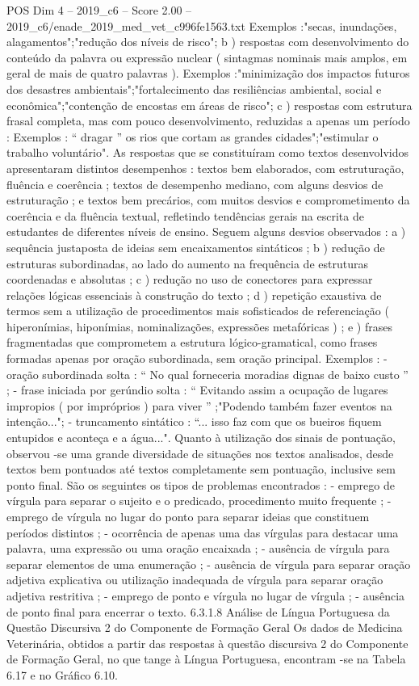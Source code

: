 \begin{textsample}{POS Dim 4 – 2019\_c6 – Score 2.00 – 2019\_c6/enade\_2019\_med\_vet\_c996fe1563.txt}
Exemplos :"secas, inundações, alagamentos";"redução dos níveis de risco"; b ) respostas com desenvolvimento do conteúdo da palavra ou expressão nuclear ( sintagmas nominais mais amplos, em geral de mais de quatro palavras ).
Exemplos :"minimização dos impactos futuros dos desastres ambientais";"fortalecimento das resiliências ambiental, social e econômica";"contenção de encostas em áreas de risco"; c ) respostas com estrutura frasal completa, mas com pouco desenvolvimento, reduzidas a apenas um período : Exemplos : “ dragar ” os rios que cortam as grandes cidades";"estimular o trabalho voluntário".
As respostas que se constituíram como textos desenvolvidos apresentaram distintos desempenhos : textos bem elaborados, com estruturação, fluência e coerência ; textos de desempenho mediano, com alguns desvios de estruturação ; e textos bem precários, com muitos desvios e comprometimento da coerência e da fluência textual, refletindo tendências gerais na escrita de estudantes de diferentes níveis de ensino.
Seguem alguns desvios observados : a ) sequência justaposta de ideias sem encaixamentos sintáticos ; b ) redução de estruturas subordinadas, ao lado do aumento na frequência de estruturas coordenadas e absolutas ; c ) redução no uso de conectores para expressar relações lógicas essenciais à construção do texto ; d ) repetição exaustiva de termos sem a utilização de procedimentos mais sofisticados de referenciação ( hiperonímias, hiponímias, nominalizações, expressões metafóricas ) ; e ) frases fragmentadas que comprometem a estrutura lógico-gramatical, como frases formadas apenas por oração subordinada, sem oração principal.
Exemplos : - oração subordinada solta : “ No qual forneceria moradias dignas de baixo custo ” ; - frase iniciada por gerúndio solta : “ Evitando assim a ocupação de lugares impropios ( por impróprios ) para viver ” ;"Podendo também fazer eventos na intenção..."; - truncamento sintático : “... isso faz com que os bueiros fiquem entupidos e aconteça e a água...".
Quanto à utilização dos sinais de pontuação, observou -se uma grande diversidade de situações nos textos analisados, desde textos bem pontuados até textos completamente sem pontuação, inclusive sem ponto final.
São os seguintes os tipos de problemas encontrados : - emprego de vírgula para separar o sujeito e o predicado, procedimento muito frequente ; - emprego de vírgula no lugar do ponto para separar ideias que constituem períodos distintos ; - ocorrência de apenas uma das vírgulas para destacar uma palavra, uma expressão ou uma oração encaixada ; - ausência de vírgula para separar elementos de uma enumeração ; - ausência de vírgula para separar oração adjetiva explicativa ou utilização inadequada de vírgula para separar oração adjetiva restritiva ; - emprego de ponto e vírgula no lugar de vírgula ; - ausência de ponto final para encerrar o texto. 6.3.1.8 Análise de Língua Portuguesa da Questão Discursiva 2 do Componente de Formação Geral Os dados de Medicina Veterinária, obtidos a partir das respostas à questão discursiva 2 do Componente de Formação Geral, no que tange à Língua Portuguesa, encontram -se na Tabela 6.17 e no Gráfico 6.10.

\end{textsample}
